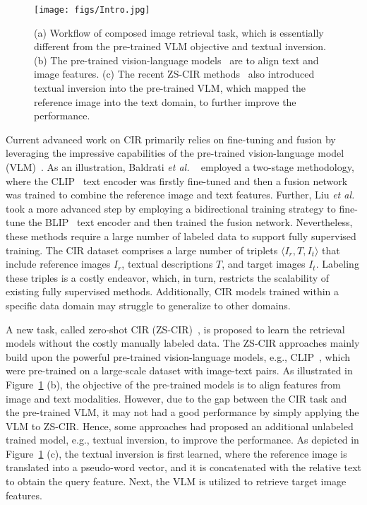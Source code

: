 \documentclass[10pt,twocolumn,letterpaper]{article}
\begin{document}
\begin{figure}[t]
    \centering
    \texttt{[image: figs/Intro.jpg]}
    \caption{(a) Workflow of composed image retrieval task, which is essentially different from the pre-trained VLM objective and textual inversion. (b) The pre-trained vision-language models~\cite{li2022blip, radford2021clip} are to align text and image features. (c) The recent ZS-CIR methods~\cite{Baldrati_2023_ICCV, saito2023pic2word} also introduced textual inversion into the pre-trained VLM, which mapped the reference image into the text domain, to further improve the performance.}
    \label{fig:intro}
\end{figure}

Current advanced work on CIR primarily relies on fine-tuning and fusion by leveraging the impressive capabilities of the pre-trained vision-language model (VLM)~\cite{baldrati2022effective, baldrati2022conditioned, liu2023bi}. As an illustration, Baldrati \textit{et al.} ~\cite{baldrati2022conditioned} employed a two-stage methodology, where the CLIP~\cite{radford2021clip} text encoder was firstly fine-tuned and then a fusion network was trained to combine the reference image and text features. Further, Liu \textit{et al.}~\cite{liu2023bi} took a more advanced step by employing a bidirectional training strategy to fine-tune the BLIP~\cite{li2022blip} text encoder and then trained the fusion network. Nevertheless, these methods require a large number of labeled data to support fully supervised training. The CIR dataset comprises a large number of triplets $\langle I_r, T, I_t\rangle$ that include reference images $I_r$, textual descriptions $T$, and target images $I_t$. Labeling these triples is a costly endeavor, which, in turn, restricts the scalability of existing fully supervised methods. Additionally, CIR models trained within a specific data domain may struggle to generalize to other domains. 

A new task, called zero-shot CIR (ZS-CIR)~\cite{Baldrati_2023_ICCV, saito2023pic2word}, is proposed to learn the retrieval models without the costly manually labeled data. The ZS-CIR approaches mainly build upon the powerful pre-trained vision-language models, e.g., CLIP~\cite{radford2021clip}, which were pre-trained on a large-scale dataset with image-text pairs. As illustrated in Figure~\ref{fig:intro} (b), the objective of the pre-trained models is to align features from image and text modalities. However, due to the gap between the CIR task and the pre-trained VLM, it may not had a good performance by simply applying the VLM to ZS-CIR. Hence, some approaches \cite{Baldrati_2023_ICCV, saito2023pic2word} had proposed an additional unlabeled trained model, e.g., textual inversion, to improve the performance. As depicted in Figure~\ref{fig:intro} (c), the textual inversion is first learned, where the reference image is translated into a pseudo-word vector, and it is concatenated with the relative text to obtain the query feature. Next, the VLM is utilized to retrieve target image features. 
\end{document}
